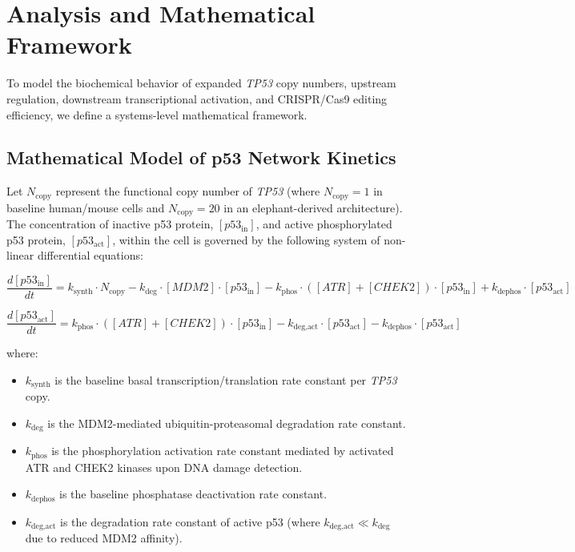 \documentclass[11pt,a4paper]{article}
\begin{document}
\section{Analysis and Mathematical Framework}

To model the biochemical behavior of expanded \textit{TP53} copy numbers, upstream regulation, downstream transcriptional activation, and CRISPR/Cas9 editing efficiency, we define a systems-level mathematical framework.

\subsection{Mathematical Model of p53 Network Kinetics}

Let $N_{\text{copy}}$ represent the functional copy number of \textit{TP53} (where $N_{\text{copy}} = 1$ in baseline human/mouse cells and $N_{\text{copy}} = 20$ in an elephant-derived architecture). The concentration of inactive p53 protein, $[p53_{\text{in}}]$, and active phosphorylated p53 protein, $[p53_{\text{act}}]$, within the cell is governed by the following system of non-linear differential equations:

\begin{equation}
\frac{d[p53_{\text{in}}]}{dt} = k_{\text{synth}} \cdot N_{\text{copy}} - k_{\text{deg}} \cdot [MDM2] \cdot [p53_{\text{in}}] - k_{\text{phos}} \cdot ([ATR] + [CHEK2]) \cdot [p53_{\text{in}}] + k_{\text{dephos}} \cdot [p53_{\text{act}}]
\end{equation}

\begin{equation}
\frac{d[p53_{\text{act}}]}{dt} = k_{\text{phos}} \cdot ([ATR] + [CHEK2]) \cdot [p53_{\text{in}}] - k_{\text{deg,act}} \cdot [p53_{\text{act}}] - k_{\text{dephos}} \cdot [p53_{\text{act}}]
\end{equation}

where:
\begin{itemize}
    \item $k_{\text{synth}}$ is the baseline basal transcription/translation rate constant per \textit{TP53} copy.
    \item $k_{\text{deg}}$ is the MDM2-mediated ubiquitin-proteasomal degradation rate constant.
    \item $k_{\text{phos}}$ is the phosphorylation activation rate constant mediated by activated ATR and CHEK2 kinases upon DNA damage detection.
    \item $k_{\text{dephos}}$ is the baseline phosphatase deactivation rate constant.
    \item $k_{\text{deg,act}}$ is the degradation rate constant of active p53 (where $k_{\text{deg,act}} \ll k_{\text{deg}}$ due to reduced MDM2 affinity).
\end{itemize}
\end{document}
